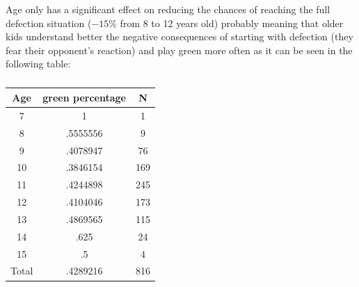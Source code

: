 \documentclass{article} %
\begin{document}
Age only has a significant effect on reducing the chances of reaching the full defection situation ($-15\%$ from 8 to 12 years old) probably meaning that older kids understand better the negative consequences of starting with defection (they fear their opponent's reaction) and play green more often as it can be seen in the following table:
\begin{table}[htbp]\centering
\caption{\label{} 
\textbf{} }\begin{tabular} {@{} c c c @{}} \\ \hline
\textbf{Age} & \textbf{green percentage} &  \textbf{N}\\
\hline
       7  &          1 &          1 \\
       8  &   .5555556 &          9 \\
       9  &   .4078947 &         76 \\
      10  &   .3846154 &        169 \\
      11  &   .4244898 &        245 \\
      12  &   .4104046 &        173 \\
      13  &   .4869565 &        115 \\
      14  &       .625 &         24 \\
      15  &         .5 &          4 \\
   Total  &   .4289216 &        816 \\

\hline
\end{tabular}
\end{table}
\end{document}
